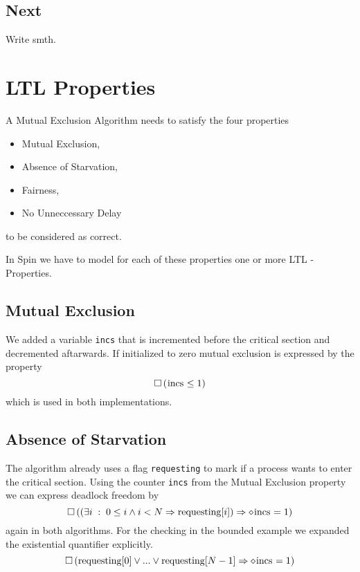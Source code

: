 \documentclass{llncs}
\begin{document}
\subsection{Next}

Write smth.

\section{LTL Properties}

A Mutual Exclusion Algorithm needs to satisfy the four properties
\begin{itemize}
    \item Mutual Exclusion,
    \item Absence of Starvation,
    \item Fairness,
    \item No Unneccessary Delay
\end{itemize}
to be considered as correct.

In Spin we have to model for each of these properties one or more
LTL - Properties.

\subsection{Mutual Exclusion}

We added a variable \lstinline|incs| that is incremented before the critical section
and decremented aftarwards. If initialized to zero mutual exclusion is expressed by the
property
\begin{equation}
    \square \left( \text{\lstinline|incs|} \leq 1 \right)
\end{equation}
which is used in both implementations.

\subsection{Absence of Starvation}

The algorithm already uses a flag \lstinline|requesting| to mark if a process wants to enter the critical section.
Using the counter \lstinline|incs| from the Mutual Exclusion property we can express deadlock freedom by
\begin{equation}
    \square \left( (\exists i \; : \; 0 \leq i \land i < N \Rightarrow \text{\lstinline|requesting|}[i]) \Rightarrow \diamond \text{\lstinline|incs|} = 1\right)
\end{equation}
again in both algorithms. For the checking in the bounded example we expanded the existential quantifier explicitly.
\begin{equation}
    \square \left( \text{\lstinline|requesting|}[0] \lor ... \lor \text{\lstinline|requesting|}[N-1] \Rightarrow \diamond \text{\lstinline|incs|} = 1 \right)
\end{equation}
\end{document}
